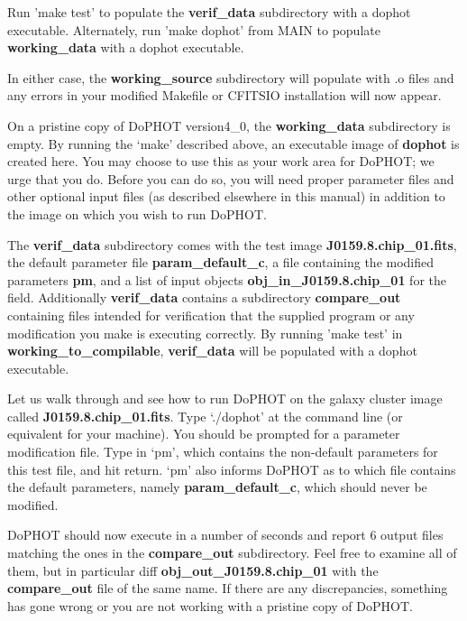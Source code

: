 Run 'make test' to populate the {\bf verif\_data} subdirectory with a dophot 
executable.
Alternately, run 'make dophot' from MAIN to populate {\bf working\_data} 
with a dophot executable.

In either case, the {\bf working\_source} subdirectory will populate with
.o files and any errors in your modified Makefile or CFITSIO installation 
will now appear.

	On a pristine copy of DoPHOT version4\_0, the {\bf working\_data}
subdirectory is empty. By running the `make' described above, an executable
image of {\bf dophot} is created here. You may choose to use this 
as your work area for DoPHOT; we urge that you do. Before you can do so, 
you will need proper parameter files and other optional input files
(as described elsewhere in this manual) in addition to the image on which
you wish to run DoPHOT. 

	The {\bf verif\_data} subdirectory comes with the test image 
{\bf J0159.8.chip\_01.fits}, the default parameter file 
{\bf param\_default\_c}, a file containing the modified parameters {\bf pm}, 
and a list of input objects {\bf obj\_in\_J0159.8.chip\_01} for the field. Additionally 
{\bf verif\_data} contains a subdirectory {\bf compare\_out} containing files 
intended for verification that the supplied program or any modification you 
make is executing correctly.  By running 'make test' in 
{\bf working\_to\_compilable}, {\bf verif\_data} will be populated with a 
dophot executable.

Let us walk through and see how to run DoPHOT on the galaxy cluster image 
called {\bf J0159.8.chip\_01.fits}.  
Type `./dophot' at the command line (or equivalent for your machine).  You 
should be prompted for a parameter modification file.  Type in `pm', which 
contains the non-default parameters for this test file, and hit return.  `pm' also 
informs DoPHOT as to which file contains the default parameters, namely 
{\bf param\_default\_c}, which should never be modified.  

DoPHOT should now execute in a number of seconds and report 6 output files 
matching the ones in the {\bf compare\_out} subdirectory. Feel free to examine 
all of them, but in particular diff {\bf obj\_out\_J0159.8.chip\_01} with 
the {\bf compare\_out} file of the same name.  If there are any discrepancies, 
something has gone wrong or you are not working with a pristine copy of 
DoPHOT. 











